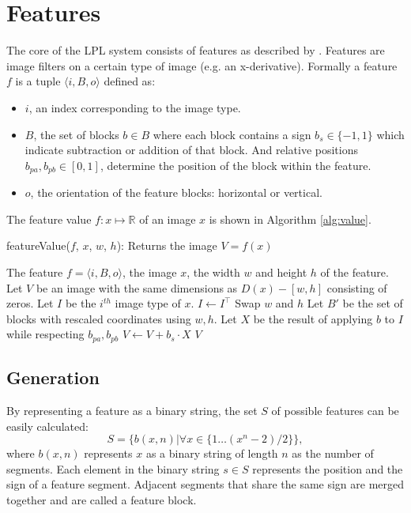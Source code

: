 \documentclass[a4paper,11pt]{article}
\begin{document}
\section{Features} \label{sec:feat}
The core of the LPL system consists of features as described by
\cite{dlagnekov_thesis, zhang,naturaltext}. Features are image filters on a
certain type of image (e.g. an x-derivative). Formally a feature $f$ is a
tuple $\langle i, B, o \rangle$ defined as:
\begin{itemize}
	\item{$i$, an index corresponding to the image type.}
	\item{$B$, the set of blocks $b \in B$ where each block contains a sign
	$b_s \in \{-1,1\}$ which indicate subtraction or addition of that block.
	And relative positions $b_{pa},b_{pb} \in [0,1]$, determine the
	position of the block within the feature.}
	\item{$o$, the orientation of the feature blocks: horizontal or vertical.}
\end{itemize}
The feature value $f:x\mapsto\mathbb{R}$ of an image $x$ is shown in Algorithm
\ref{alg:value}.
\begin{algorithm}
	\caption{featureValue($f$, $x$, $w$, $h$): Returns the image $V = f(x)$}
	\begin{algorithmic}[1]
	\REQUIRE The feature $f = \langle i, B, o \rangle$, the image $x$, the width $w$ and height $h$ of the feature.
	\medskip
	\STATE Let $V$ be an image with the same dimensions as $D(x)-[w, h]$ consisting of zeros.
	\STATE Let $I$ be the $i^{th}$ image type of $x$.
		\STATE $I \leftarrow I^\top$
		\STATE Swap $w$ and $h$
	\ENDIF
	\STATE Let $B'$ be the set of blocks with rescaled coordinates using $w,h$.
		\STATE Let $X$ be the result of applying $b$ to $I$ while respecting $b_{pa}, b_{pb}$
		\STATE $V \leftarrow V + b_s \cdot X$
	\ENDFOR
	\RETURN $V$
	\end{algorithmic}
\label{alg:value}
\end{algorithm}

\subsection{Generation} \label{sec:gen}
By representing a feature as a binary string, the set $S$ of possible features
can be easily calculated:
$$S = \{b(x,n) | \forall x \in \{1\ldots(x^n-2)/2\}\},$$
where $b(x,n)$ represents $x$ as a binary string of length $n$ as the number of
segments. Each element in the binary string $s \in S$ represents the position
and the sign of a feature segment. Adjacent segments that share the same sign
are merged together and are called a feature block.
\end{document}
